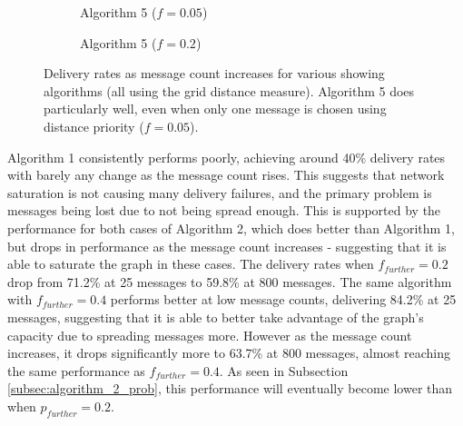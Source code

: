 \documentclass[bsc,frontabs,twoside,singlespacing,parskip,deptreport]{infthesis}     %
\begin{document}
\begin{figure}
\begin{subfigure}[]{0.47\textwidth}
\caption{Algorithm 5 ($f=0.05$)}
\end{subfigure}
%
\begin{subfigure}[]{0.47\textwidth}
\caption{Algorithm 5 ($f=0.2$)}
\end{subfigure}
\caption{Delivery rates as message count increases for various showing algorithms (all using the grid distance measure). Algorithm 5 does particularly well, even when only one message is chosen using distance priority ($f=0.05$).}
\label{fig:all_show_models}
\end{figure}

Algorithm 1 consistently performs poorly, achieving around 40\% delivery rates with barely any change as the message count rises. This suggests that network saturation is not causing many delivery failures, and the primary problem is messages being lost due to not being spread enough. This is supported by the performance for both cases of Algorithm 2, which does better than Algorithm 1, but drops in performance as the message count increases - suggesting that it is able to saturate the graph in these cases. The delivery rates when $f_{further}=0.2$ drop from 71.2\% at 25 messages to 59.8\% at 800 messages. The same algorithm with $f_{further}=0.4$ performs better at low message counts, delivering 84.2\% at 25 messages, suggesting that it is able to better take advantage of the graph's capacity due to spreading messages more. However as the message count increases, it drops significantly more to 63.7\% at 800 messages, almost reaching the same performance as $f_{further}=0.4$. As seen in Subsection \ref{subsec:algorithm_2_prob}, this performance will eventually become lower than when $p_{further}=0.2$.
\end{document}

